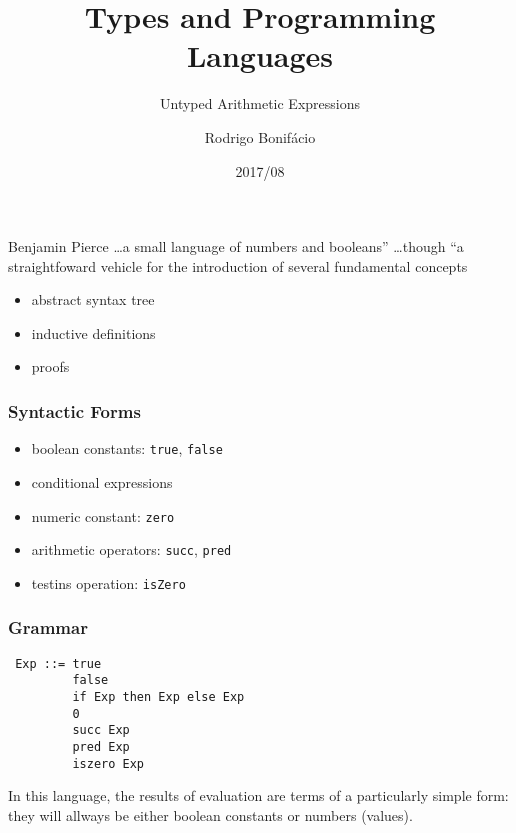 \documentclass{beamer}
\title{Types and Programming Languages}
\subtitle{Untyped Arithmetic Expressions}
\author{Rodrigo Bonif\'{a}cio}
\date{2017/08}
\begin{document}
\begin{frame}
\titlepage
\end{frame}

\begin{frame}
\begin{shadequote}[l]{Benjamin Pierce}
\ldots a small language of numbers and booleans'' \ldots though 
``a straightfoward vehicle for the introduction of several fundamental concepts
\end{shadequote}

\pause 
\begin{itemize}
\item abstract syntax tree
\item inductive definitions 
\item proofs
\end{itemize}

\end{frame}

\begin{frame}
\frametitle{Syntactic Forms} 

\begin{itemize}
\item boolean constants: \texttt{true}, \texttt{false}
\item conditional expressions
\item numeric constant: \texttt{zero}
\item arithmetic operators: \texttt{succ}, \texttt{pred}
\item testins operation: \texttt{isZero} 
\end{itemize}
\end{frame}

\begin{frame}[fragile]
\frametitle{Grammar} 

\begin{verbatim}
 Exp ::= true
         false 
         if Exp then Exp else Exp
         0
         succ Exp
         pred Exp
         iszero Exp
\end{verbatim}
\end{frame}

\begin{frame}
In this language, the results of evaluation 
are terms of a particularly simple form: they will 
allways be either boolean constants or numbers (values). 
\end{frame}
\end{document}

